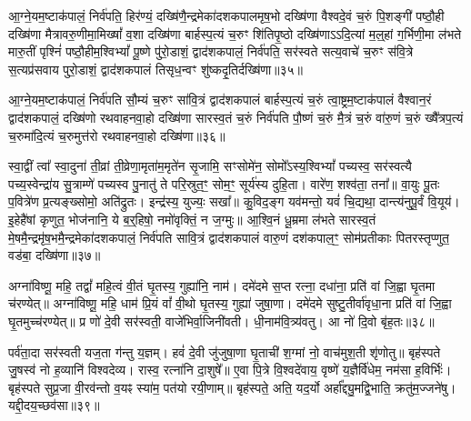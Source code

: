 {\anuvakamend[{वा॒र॒व॒न्तीयं॑ च॒त्वारि॑ च॥18॥}]}

आ॒ग्ने॒यम॒ष्टाक॑पालं॒ निर्व॑पति॒ हिर॑ण्यं॒ दख्षि॑णै॒न्द्रमेका॑दशकपालमृष॒भो दख्षि॑णा वैश्वदे॒वं च॒रुं पि॒शङ्गी॑ पष्ठौ॒ही दख्षि॑णा मैत्रावरु॒णीमा॒मिख्षां᳚ व॒शा दख्षि॑णा बार्\mbox{}हस्प॒त्यं च॒रुꣳ शि॑तिपृ॒ष्ठो दख्षि॑णा\-ऽ\-ऽदि॒त्यां म॒ल्॒\mbox{}हां ग॒र्भिणी॒मा ल॑भते मारु॒तीं पृश्निं॑ पष्ठौ॒हीम॒श्वि\-भ्यां᳚ पू॒ष्णे पु॑रो॒डाशं॒ द्वाद॑शकपालं॒ निर्व॑पति॒ सर॑स्वते सत्य॒वाचे॑ च॒रुꣳ स॑वि॒त्रे स॒त्यप्र॑सवाय पुरो॒डाशं॒ द्वाद॑शकपालं तिसृध॒न्वꣳ शु॑ष्कदृ॒तिर्दख्षि॑णा॥३५॥

{\anuvakamend[{आ॒ग्ने॒यꣳ स॒प्तच॑त्वारिꣳशत्॥19॥}]}

आ॒ग्ने॒यम॒ष्टाक॑पालं॒ निर्व॑पति सौ॒म्यं च॒रुꣳ सा॑वि॒त्रं द्वाद॑शकपालं बार्\mbox{}हस्प॒त्यं च॒रुं त्वा॒ष्ट्रम॒ष्टाक॑पालं वैश्वान॒रं द्वाद॑शकपालं॒ दख्षि॑णो रथवाहनवा॒हो दख्षि॑णा सारस्व॒तं च॒रुं निर्व॑पति पौ॒ष्णं च॒रुं मै॒त्रं च॒रुं वा॑रु॒णं च॒रुं ख्षै᳚त्रप॒त्यं च॒रुमा॑दि॒त्यं च॒रुमुत्त॑रो रथवाहनवा॒हो दख्षि॑णा॥३६॥

{\anuvakamend[{आ॒ग्ने॒यं चतु॑स्त्रिꣳशत्॥20॥}]}

स्वा॒द्वीं त्वा᳚ स्वा॒दुना॑ ती॒व्रां ती॒व्रेणा॒मृता॑म॒मृते॑न सृ॒जामि॒ सꣳसोमे॑न॒ सोमो᳚\-ऽस्य॒श्वि\-भ्यां᳚ पच्यस्व॒ सर॑स्वत्यै पच्य॒स्वेन्द्रा॑य सु॒त्राम्णे॑ पच्यस्व पु॒नातु॑ ते परि॒स्रुत॒ꣳ॒ सोम॒ꣳ॒ सूर्य॑स्य दुहि॒ता। वारे॑ण॒ शश्व॑ता॒ तना᳚॥ वा॒युः पू॒तः प॒वित्रे॑ण प्र॒त्यङ्ख्सोमो॒ अति॑द्रुतः। इन्द्र॑स्य॒ युज्यः॒ सखा᳚॥ कु॒विद॒ङ्ग यव॑मन्तो॒ यवं॑ चि॒द्यथा॒ दान्त्य॑नुपू॒र्वं वि॒यूय॑। इ॒हेहै॑षां कृणुत॒ भोज॑नानि॒ ये ब॒र्॒\mbox{}हिषो॒ नमो॑वृक्तिं॒ न ज॒ग्मुः॥ आ॒श्वि॒नं धू॒म्रमा ल॑भते सारस्व॒तं मे॒षमै॒न्द्रमृ॑ष॒भमै॒न्द्रमेका॑दशकपालं॒ निर्व॑पति सावि॒त्रं द्वाद॑शकपालं वारु॒णं दश॑कपाल॒ꣳ॒ सोम॑प्रतीकाः पितरस्तृप्णुत॒ वड॑बा॒ दख्षि॑णा॥३७॥

{\anuvakamend[{भोज॑नानि॒ षड््विꣳ॑शतिश्च॥21॥}]}

अग्ना॑विष्णू॒ महि॒ तद्वां᳚ महि॒त्वं वी॒तं घृ॒तस्य॒ गुह्या॑नि॒ नाम॑। दमे॑दमे स॒प्त रत्ना॒ दधा॑ना॒ प्रति॑ वां जि॒ह्वा घृ॒तमा च॑रण्येत्॥ अग्ना॑विष्णू॒ महि॒ धाम॑ प्रि॒यं वां᳚ वी॒थो घृ॒तस्य॒ गुह्या॑ जुषा॒णा। दमे॑दमे सुष्टु॒तीर्वा॑वृधा॒ना प्रति॑ वां जि॒ह्वा घृ॒तमुच्च॑रण्येत्॥ प्र णो॑ दे॒वी सर॑स्वती॒ वाजे॑भिर्वा॒जिनी॑वती। धी॒नाम॑वि॒त्र्य॑वतु। आ नो॑ दि॒वो बृ॑ह॒तः॥३८॥

पर्व॑ता॒दा सर॑स्वती यज॒ता ग॑न्तु य॒ज्ञम्। हवं॑ दे॒वी जु॑जुषा॒णा घृ॒ताची॑ श॒ग्मां नो॒ वाच॑मुश॒ती शृ॑णोतु॥ बृह॑स्पते जु॒षस्व॑ नो ह॒व्यानि॑ विश्वदेव्य। रास्व॒ रत्ना॑नि दा॒शुषे᳚॥ ए॒वा पि॒त्रे वि॒श्वदे॑वाय॒ वृष्णे॑ य॒ज्ञैर्वि॑धेम॒ नम॑सा ह॒विर्भिः॑। बृह॑स्पते सुप्र॒जा वी॒रव॑न्तो व॒यꣴ स्या॑म॒ पत॑यो रयी॒णाम्॥ बृह॑स्पते॒ अति॒ यद॒र्यो अर्\mbox{}हा᳚द्द्यु॒मद्वि॒भाति॒ क्रतु॑म॒ज्जने॑षु। यद्दी॒दय॒च्छव॑सा॥३९॥

